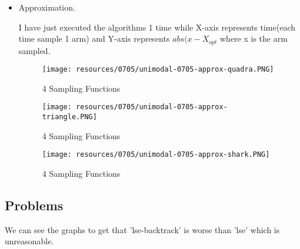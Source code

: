 \begin{itemize}
	\item Approximation.
	
	I have just executed the algorithms 1 time while X-axis represents time(each time sample 1 arm) and Y-axis represents $abs(x-X_{opt}$ where x is the arm sampled.
	
	
	\begin{figure}[h]
	\center
	\texttt{[image: resources/0705/unimodal-0705-approx-quadra.PNG]}
	\caption{4 Sampling Functions}
	\label{unimodal-0705-approx-quadra}
	\end{figure}
	
	\begin{figure}[h]
	\center
	\texttt{[image: resources/0705/unimodal-0705-approx-triangle.PNG]}
	\caption{4 Sampling Functions}
	\label{unimodal-0705-approx-triangle}
	\end{figure}
	\begin{figure}[h]
	\center
	\texttt{[image: resources/0705/unimodal-0705-approx-shark.PNG]}
	\caption{4 Sampling Functions}
	\label{unimodal-0705-approx-shark}
	\end{figure}	

\end{itemize}

\subsection*{Problems}
We can see the graphs to get that 'lse-backtrack' is worse than 'lse' which is unreasonable.





